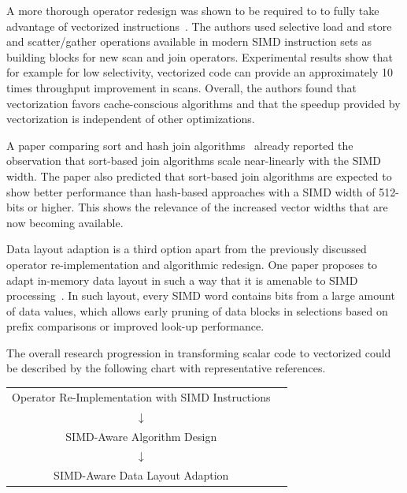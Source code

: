 \documentclass[sigconf]{acmart}
\begin{document}
A more thorough operator redesign was shown to be required to to fully take advantage of vectorized 
instructions~\cite{Polychroniou:2015:RSV:2723372.2747645}. The authors used selective load and store and scatter/gather operations available
in modern SIMD instruction sets as building blocks for new scan and join operators. Experimental results show that for example for low
selectivity, vectorized code can provide an approximately 10 times throughput improvement in scans. Overall, the authors found that
vectorization favors cache-conscious algorithms and that the speedup provided by vectorization is independent of other optimizations.

A paper comparing sort and hash join algorithms~\cite{DBLP:journals/pvldb/KimSCKNBLSD09} already reported the observation that sort-based join
algorithms scale near-linearly with the SIMD width. The paper also predicted that sort-based join algorithms are expected to show better
performance than hash-based approaches with a SIMD width of 512-bits or higher. This shows the relevance of the increased vector widths that
are now becoming available.

Data layout adaption is a third option apart from the previously discussed operator re-implementation and algorithmic redesign. One paper proposes
to adapt in-memory data layout in such a way that it is amenable to SIMD processing~\cite{Li:2013:BFS:2463676.2465322}. In such layout, every
SIMD word contains bits from a large amount of data values, which allows early pruning of data blocks in selections based on prefix comparisons
or improved look-up performance.

The overall research progression in transforming scalar code to vectorized could be described by the following chart with
representative references.

\begin{center}
\begin{tabular}{cr}
Operator Re-Implementation with SIMD Instructions & \cite{DBLP:conf/sigmod/ZhouR02} \\
$\downarrow$ & \\
SIMD-Aware Algorithm Design & \cite{Polychroniou:2015:RSV:2723372.2747645} \\
$\downarrow$ & \\
SIMD-Aware Data Layout Adaption & \cite{Li:2013:BFS:2463676.2465322}\\
\end{tabular}
\end{center}
\end{document}
